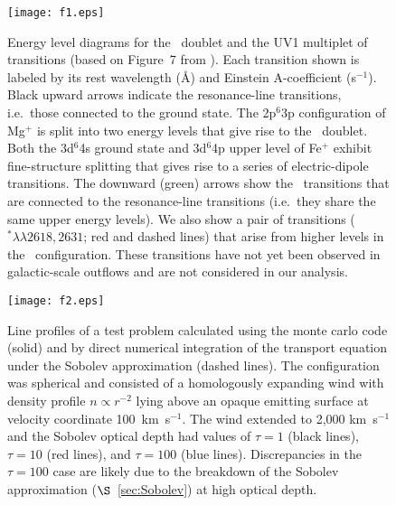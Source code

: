 \documentclass[12pt,preprint]{aastex}
\begin{document}
\begin{figure}
\texttt{[image: f1.eps]}
\caption{
Energy level diagrams for the \mgiid\ doublet and the UV1
multiplet of  transitions   
(based on Figure~7 from \cite{hmt+99}).
Each transition shown is
labeled by its rest wavelength (\AA) and Einstein A-coefficient
(s$^{-1}$). Black upward arrows
indicate the resonance-line transitions, i.e.\ those connected to the ground
state.  The 2p$^6$3p configuration of Mg$^+$ is split into
two energy levels that give rise to the \mgiid\ doublet.  
Both the 3d$^6$4s ground state and 3d$^6$4p upper level of Fe$^+$
exhibit fine-structure splitting that gives rise to a series of
electric-dipole transitions. 
The downward (green) arrows show the \feiis\ transitions that are connected to the
resonance-line transitions (i.e.\ they share the same upper energy
levels).  We also show a pair of transitions ($^* \lambda\lambda
2618,2631$; red and dashed lines) that arise from higher levels in the \zconfig\
configuration.  These transitions have not yet been observed in
galactic-scale outflows and are not considered in our analysis.
}
\label{fig:energy}
\end{figure}

\begin{figure}
\texttt{[image: f2.eps]}
\caption{
Line profiles of a test problem calculated using the monte carlo code (solid) and by direct numerical integration of the transport equation under the Sobolev approximation (dashed lines).  The configuration was  spherical and consisted of a homologously expanding wind  with density profile $n \propto r^{-2}$  lying above an opaque emitting surface at velocity coordinate 100~km~s$^{-1}$.  
The wind extended to 2,000 km~s$^{-1}$ and the Sobolev optical depth
had values of  $\tau = 1$ (black lines), $\tau = 10$ (red lines), and
$\tau = 100$ (blue lines).    Discrepancies in the $\tau = 100$ case
are likely due to the breakdown of the Sobolev approximation
($\S$~\ref{sec:Sobolev}) at high optical depth. 
}
\label{fig:oneline_test}
\end{figure}
\end{document}
